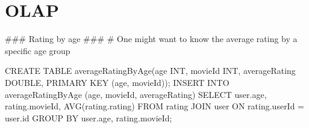 \section{OLAP}
\begin{spverbatim}
### Rating by age ###
# One might want to know the average rating by a specific age group

CREATE TABLE averageRatingByAge(age INT, movieId INT, averageRating DOUBLE, PRIMARY KEY (age, movieId));
INSERT INTO averageRatingByAge (age, movieId, averageRating) SELECT user.age, rating.movieId, AVG(rating.rating) FROM rating JOIN user ON rating.userId = user.id GROUP BY user.age, rating.movieId;
\end{spverbatim}
\newpage
